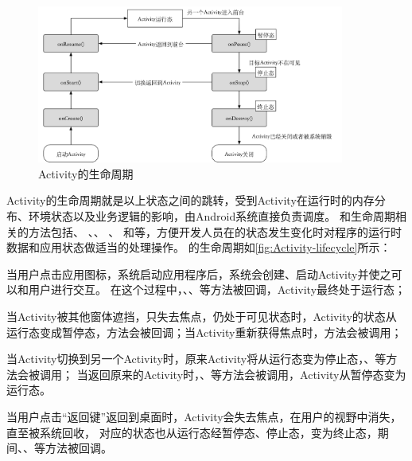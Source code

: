 \begin{figure}[!ht]
	\centering
	\includegraphics[width=0.9\textwidth]{./Figures/Activity-lifecycle-Landscape.png}
	
	\caption{Activity的生命周期}
	\label{fig:Activity-lifecycle}
\end{figure}

Activity的生命周期就是以上状态之间的跳转，受到Activity在运行时的内存分布、环境状态以及业务逻辑的影响，由Android系统直接负责调度。
和生命周期相关的方法包括、 、、 、 和等，方便开发人员在的状态发生变化时对程序的运行时数据和应用状态做适当的处理操作。
的生命周期如\autoref{fig:Activity-lifecycle}所示：



当用户点击应用图标，系统启动应用程序后，系统会创建、启动Activity并使之可以和用户进行交互。
在这个过程中，、、等方法被回调，Activity最终处于运行态；


当Activity被其他窗体遮挡，只失去焦点，仍处于可见状态时，Activity的状态从运行态变成暂停态，方法会被回调；当Activity重新获得焦点时，方法会被调用；

当Activity切换到另一个Activity时，原来Activity将从运行态变为停止态，、等方法会被调用；
当返回原来的Activity时，、等方法会被调用，Activity从暂停态变为运行态。

当用户点击“返回键”返回到桌面时，Activity会失去焦点，在用户的视野中消失，直至被系统回收，
对应的状态也从运行态经暂停态、停止态，变为终止态，期间、、等方法被回调。

